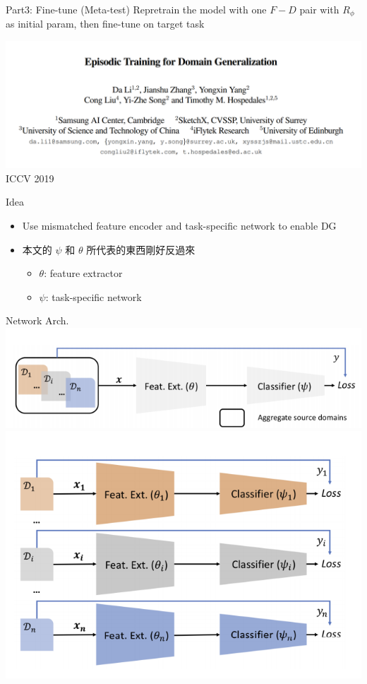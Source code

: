 \documentclass{beamer}
\begin{document}
\begin{frame}{Part3: Fine-tune (Meta-test)}
  Repretrain the model with one $F-D$ pair with $R_\phi$ as initial param, then fine-tune on target task
\end{frame}

\begin{frame}
  \includegraphics[width=\textwidth]{fig/EpiFCR-title.png}
  \center ICCV 2019
\end{frame}

\begin{frame}{Idea}
  \begin{itemize}
    \item Use mismatched feature encoder and task-specific network to enable DG
    \item 本文的 $\psi$ 和 $\theta$ 所代表的東西剛好反過來
      \begin{itemize}
        \item $\theta$: feature extractor
        \item $\psi$: task-specific network
      \end{itemize}
  \end{itemize}
\end{frame}

\begin{frame}{Network Arch.}
  \includegraphics[width=.5\textwidth]{fig/epi-agg.png}
  \includegraphics[width=.5\textwidth]{fig/epi-ind.png}
\end{frame}
\end{document}
